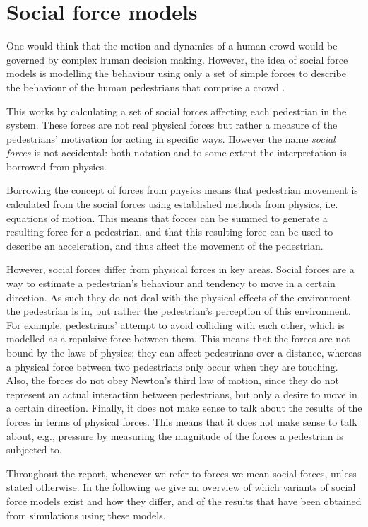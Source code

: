 \section{Social force models}
\label{sec:social-forces}
One would think that the motion and dynamics of a human crowd would be
governed by complex human decision making. However, the idea of social force
models is modelling the behaviour using only a set of simple forces to
describe the behaviour of the human pedestrians that comprise a crowd 
\cite{social-force}.

This works by calculating a set of social forces affecting each pedestrian in 
the system.  These forces are not real physical forces but rather a measure of 
the  pedestrians' motivation for acting in specific ways. However the name 
\emph{social forces} is not accidental: both notation and to some extent the 
interpretation is borrowed from physics.

Borrowing the concept of forces from physics  means that pedestrian movement 
is calculated from the social forces using established methods from physics, 
i.e. equations of motion. This means that forces can be summed to generate a 
resulting force for a pedestrian, and that this resulting force can be used to 
describe an acceleration, and thus affect the movement of the pedestrian.

However, social forces differ from physical forces in key areas. Social forces 
are a way to estimate a pedestrian's behaviour and tendency to move in a 
certain direction. As such they do not deal with the physical effects of the 
environment the pedestrian is in, but rather the pedestrian's perception of 
this environment. For example, pedestrians' attempt to avoid colliding with 
each other, which is modelled as a repulsive force between them. This means 
that the forces are not bound by the laws of physics; they can affect 
pedestrians over a distance, whereas a physical force between two pedestrians 
only occur when they are touching. Also, the forces do not obey Newton's third 
law of motion, since they do not represent an actual interaction between 
pedestrians, but only a desire to move in a certain direction. Finally, it 
does not make sense to talk about the results of the forces in terms of 
physical forces. This means that it does not make sense to talk about, e.g., 
pressure by measuring the magnitude of the forces a pedestrian is subjected 
to.

Throughout the report, whenever we refer to forces we mean social forces, 
unless stated otherwise. In the following we give an overview of which 
variants of social force models exist and how they differ, and of the results 
that have been obtained from simulations using these models.

